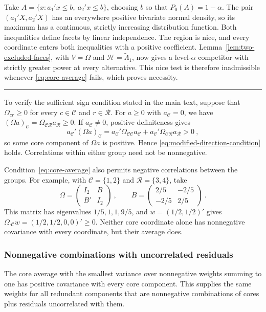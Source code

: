 \documentclass[11pt]{article}
\numberwithin{equation}{section}
\def\qed{\rule{2mm}{2mm}}
\theoremstyle{definition}
\begin{document}
{{Take $A=\{x:a_1'x\le b,\ a_2'x\le b\}$, choosing $b$ so that $P_0(A)=1-\alpha$. The pair $(a_1'X,a_2'X)$ has an everywhere positive bivariate normal density, so its maximum has a continuous, strictly increasing distribution function. Both inequalities define facets by linear independence. The region is nice, and every coordinate enters both inequalities with a positive coefficient. Lemma~\ref{lem:two-excluded-faces}, with $V=\Omega$ and $\mathcal H=\widetilde\Lambda_1$, now gives a level-$\alpha$ competitor with strictly greater power at every alternative. This nice test is therefore inadmissible whenever \eqref{eq:core-average} fails, which proves necessity. \qed}

To verify the sufficient sign condition stated in the main text, suppose that $\Omega_{cr}\ge0$ for every $c\in\mathcal C$ and $r\in\mathcal R$. For $a\ge0$ with $a_{\mathcal C}=0$, we have $(\Omega a)_{\mathcal C}=\Omega_{\mathcal C\mathcal R}a_{\mathcal R}\ge0$. If $a_{\mathcal C}\ne0$, positive definiteness gives
\[
a_{\mathcal C}'(\Omega a)_{\mathcal C}
=a_{\mathcal C}'\Omega_{\mathcal C\mathcal C}a_{\mathcal C}
+a_{\mathcal C}'\Omega_{\mathcal C\mathcal R}a_{\mathcal R}>0~,
\]
so some core component of $\Omega a$ is positive. Hence \eqref{eq:modified-direction-condition} holds. Correlations within either group need not be nonnegative.

Condition~\eqref{eq:core-average} also permits negative correlations between the groups. For example, with $\mathcal C=\{1,2\}$ and $\mathcal R=\{3,4\}$, take
\[
\Omega=\begin{pmatrix}I_2&B\\B'&I_2\end{pmatrix}~,
\qquad B=\begin{pmatrix}2/5&-2/5\\-2/5&2/5\end{pmatrix}~.
\]
This matrix has eigenvalues $1/5,1,1,9/5$, and $w=(1/2,1/2)'$ gives $\Omega_{\cdot\mathcal C}w=(1/2,1/2,0,0)'\ge0$. Neither core coordinate alone has nonnegative covariance with every coordinate, but their average does.

\subsubsection*{Nonnegative combinations with uncorrelated residuals}\label{app:modified-combinations}

The core average with the smallest variance over nonnegative weights summing to one has positive covariance with every core component. This supplies the same weights for all redundant components that are nonnegative combinations of cores plus residuals uncorrelated with them.

}
\end{document}
